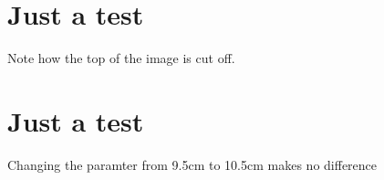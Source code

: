 \documentclass[
	a4paper,
	fontsize=10pt,
	twoside=false,
	numbers=noenddot,
]{kaobook}
\begin{document}
\mainmatter

\chapter{Just a test}

Note how the top of the image is cut off.

\chapter{Just a test}

Changing the paramter from 9.5cm to 10.5cm makes no difference
\end{document}
